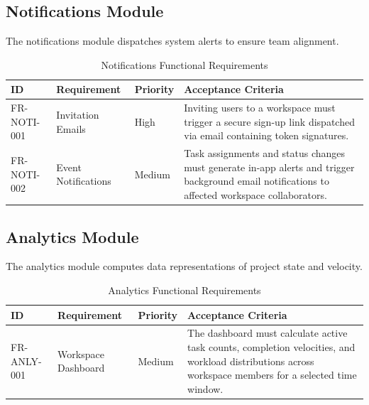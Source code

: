 \subsection{Notifications Module}
The notifications module dispatches system alerts to ensure team alignment.

\begin{table}[h!]
\centering
\small
\renewcommand{\arraystretch}{1.5}
\begin{tabularx}{\textwidth}{l p{2.2cm} l X}
    \toprule[1.5pt]
    \rowcolor{primary!5}
    \textbf{\color{primary}ID} & \textbf{\color{primary}Requirement} & \textbf{\color{primary}Priority} & \textbf{\color{primary}Acceptance Criteria} \\
    \midrule
    FR-NOTI-001 & Invitation Emails & High & Inviting users to a workspace must trigger a secure sign-up link dispatched via email containing token signatures. \\
    FR-NOTI-002 & Event Notifications & Medium & Task assignments and status changes must generate in-app alerts and trigger background email notifications to affected workspace collaborators. \\
    \bottomrule[1.5pt]
\end{tabularx}
\caption{Notifications Functional Requirements}
\label{tab:fr_noti}
\end{table}

\pagebreak
\subsection{Analytics Module}
The analytics module computes data representations of project state and velocity.

\begin{table}[h!]
\centering
\small
\renewcommand{\arraystretch}{1.5}
\begin{tabularx}{\textwidth}{l p{2.2cm} l X}
    \toprule[1.5pt]
    \rowcolor{primary!5}
    \textbf{\color{primary}ID} & \textbf{\color{primary}Requirement} & \textbf{\color{primary}Priority} & \textbf{\color{primary}Acceptance Criteria} \\
    \midrule
    FR-ANLY-001 & Workspace Dashboard & Medium & The dashboard must calculate active task counts, completion velocities, and workload distributions across workspace members for a selected time window. \\
    \bottomrule[1.5pt]
\end{tabularx}
\caption{Analytics Functional Requirements}
\label{tab:fr_anly}
\end{table}

